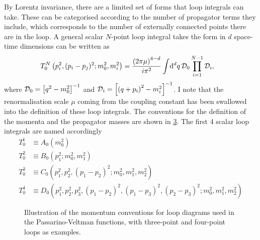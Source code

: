 \documentclass[../main.tex]{subfiles}
\begin{document}
By Lorentz invariance, there are a limited set of forms that loop integrals can take.
These can be categorised according to the number of propagator terms they include, which corresponds to the number of externally connected points there are in the loop.
A general scalar \(N\)-point loop integral takes the form in \(d\) space-time dimensions can be written as
\begin{align}
  T^N_0\left(p_i^2, (p_i-p_j)^2; m_0^2, m_i^2\right) & = \frac{\left(2\pi
      \mu\right)^{4-d}}{i \pi^2} \int \!\mathrm{d}^d q\, \mathcal{D}_0
  \prod_{i=1}^{N-1}
  \mathcal{D}_i,
\end{align}
where \(\mathcal{D}_0 = \left[q^2-m_0^2\right]^{-1}\) and \(\mathcal{D}_i =
\left[\left(q+p_i\right)^2-m_i^2\right]^{-1}\).
I note that the renormalisation scale \(\mu\) coming from the coupling constant has been swallowed into the definition of these loop integrals.
The conventions for the definition of the momenta and the propagator masses are shown in \cref{qft:fig:PV_loop_conventions}.
The first 4 scalar loop integrals are named accordingly
\begin{align}
  T^1_0 & \equiv A_0(m_0^2)
  \\
  T^2_0 & \equiv B_0(p_1^2; m_0^2, m_1^2)
  \\
  T^3_0 & \equiv C_0(p_1^2, p_2^2, (p_1-p_2)^2; m_0^2, m_1^2, m_2^2)
  \\
  T^4_0 & \equiv D_0(p_1^2, p_2^2, p_3^2, (p_1-p_2)^2, (p_1-p_3)^2,
  (p_2-p_3)^2; m_0^2, m_1^2, m_2^2)
\end{align}

\begin{figure}[ht!]
  \centering
  \begin{subfigure}{0.49\linewidth}
    \centering
    \caption{}
    \label{qft:fig:PV_triloop_conventions}
  \end{subfigure}
  \begin{subfigure}{0.49\linewidth}
    \centering
    \caption{}
    \label{qft:fig:PV_boxloop_conventions}
  \end{subfigure}
  \caption{Illustration of the momentum conventions for loop diagrams used in
    the Passarino-Veltman functions, with three-point and four-point loops as examples.}
  \label{qft:fig:PV_loop_conventions}
\end{figure}
\end{document}
